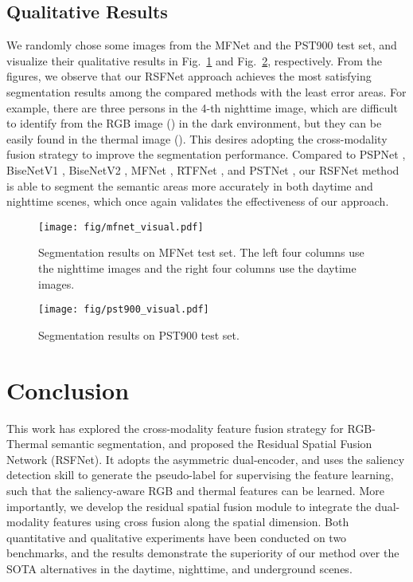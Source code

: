 \documentclass[10.5pt,twocolumn,journal,letterpaper]{IEEEtran}
\begin{document}
\subsection{Qualitative Results}
We randomly chose some images from the MFNet and the PST900 test set, and visualize their qualitative results in Fig.~\ref{fig:mfnet_visual} and Fig.~\ref{fig:pst900_visual}, respectively. From the figures, we observe that our RSFNet approach achieves the most satisfying segmentation results among the compared methods with the least error areas. For example, there are three persons in the 4-th nighttime image, which are difficult to identify from the RGB image () in the dark environment, but they can be easily found in the thermal image (). This desires adopting the cross-modality fusion strategy to improve the segmentation performance. Compared to PSPNet \cite{zhao-cvpr2017-pspnet}, BiseNetV1 \cite{yu-eccv2018-bisenet}, BiseNetV2 \cite{yu-ijcv2021-bisenetv2}, MFNet \cite{ha-iros2017-mfnet}, RTFNet \cite{sun-ral2019-rtfnet}, and PSTNet \cite{shivakumar-icra2020-pst900}, our RSFNet method is able to segment the semantic areas more accurately in both daytime and nighttime scenes, which once again validates the effectiveness of our approach.


\begin{figure}[!t]
	\centering
	\texttt{[image: fig/mfnet\_visual.pdf]}
	\caption{Segmentation results on MFNet test set. The left four columns use the nighttime images and the right four columns use the daytime images.}
	\label{fig:mfnet_visual}
\end{figure}


\begin{figure}[!t]
	\centering
	\texttt{[image: fig/pst900\_visual.pdf]}
	\caption{Segmentation results on PST900 test set.}
	\label{fig:pst900_visual}
\end{figure}



\section{Conclusion}
\label{conclusion}

This work has explored the cross-modality feature fusion strategy for RGB-Thermal semantic segmentation, and proposed the Residual Spatial Fusion Network (RSFNet). It adopts the asymmetric dual-encoder, and uses the saliency detection skill to generate the pseudo-label for supervising the feature learning, such that the saliency-aware RGB and thermal features can be learned. More importantly, we develop the residual spatial fusion module to integrate the dual-modality features using cross fusion along the spatial dimension. Both quantitative and qualitative experiments have been conducted on two benchmarks, and the results demonstrate the superiority of our method over the SOTA alternatives in the daytime, nighttime, and underground scenes.
\end{document}
